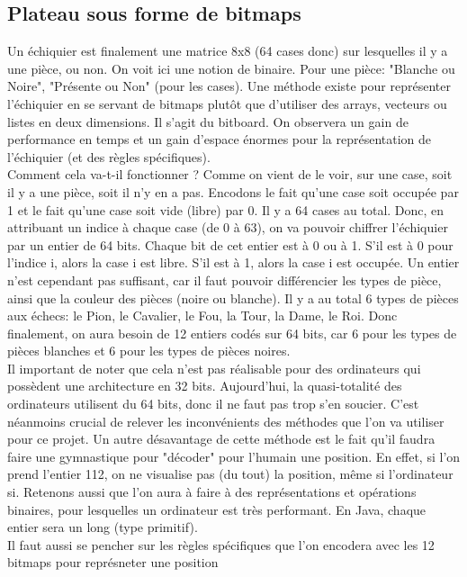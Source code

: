 \documentclass{article}
\begin{document}
\subsection{Plateau sous forme de bitmaps}
Un échiquier est finalement une matrice 8x8 (64 cases donc) sur lesquelles il y a une pièce, ou non. On voit ici une
notion de binaire. Pour une pièce: "Blanche ou Noire", "Présente ou Non" (pour les cases). Une méthode existe pour
représenter l'échiquier en se servant de bitmaps plutôt que d'utiliser des arrays, vecteurs ou listes en deux dimensions.
Il s'agit du bitboard. On observera un gain de performance en temps et un gain d'espace énormes pour la représentation
de l'échiquier (et des règles spécifiques).\\
Comment cela va-t-il fonctionner ? Comme on vient de le voir, sur une case, soit il y a une pièce, soit il n'y en a pas.
Encodons le fait qu'une case soit occupée par 1 et le fait qu'une case soit vide (libre) par 0. Il y a 64 cases au total.
Donc, en attribuant un indice à chaque case (de 0 à 63), on va pouvoir chiffrer l'échiquier par un entier de 64 bits.
Chaque bit de cet entier est à 0 ou à 1. S'il est à 0 pour l'indice i, alors la case i est libre. S'il est à 1, alors la
case i est occupée. Un entier n'est cependant pas suffisant, car il faut pouvoir différencier les types de pièce, ainsi
que la couleur des pièces (noire ou blanche). Il y a au total 6 types de pièces aux échecs: le Pion, le Cavalier, le Fou,
la Tour, la Dame, le Roi. Donc finalement, on aura besoin de 12 entiers codés sur 64 bits, car 6 pour les types de pièces
blanches et 6 pour les types de pièces noires.
\\Il important de noter que cela n'est pas réalisable pour des ordinateurs qui possèdent une architecture en 32 bits.
Aujourd'hui, la quasi-totalité des ordinateurs utilisent du 64 bits, donc il ne faut pas trop s'en soucier. C'est néanmoins
crucial de relever les inconvénients des méthodes que l'on va utiliser pour ce projet. Un autre désavantage de cette méthode
est le fait qu'il faudra faire une gymnastique pour "décoder" pour l'humain une position. En effet, si l'on prend l'entier
112, on ne visualise pas (du tout) la position, même si l'ordinateur si.
Retenons aussi que l'on aura à faire à des représentations et opérations binaires, pour lesquelles un ordinateur est très
performant. En Java, chaque entier sera un long (type primitif).
\\Il faut aussi se pencher sur les règles spécifiques que l'on encodera avec les 12 bitmaps pour représneter une position
\end{document}
